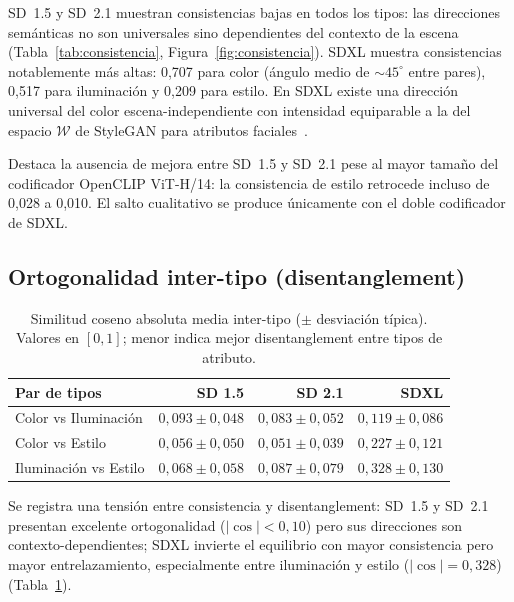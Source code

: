 \documentclass[12pt, a4paper, twoside]{book}
\begin{document}
SD~1.5 y SD~2.1 muestran consistencias bajas en todos los tipos: las direcciones semánticas
no son universales sino dependientes del contexto de la escena
(Tabla~\ref{tab:consistencia}, Figura~\ref{fig:consistencia}).
SDXL muestra consistencias notablemente más altas: 0,707 para color (ángulo medio de ${\sim}45^{\circ}$
entre pares), 0,517 para iluminación y 0,209 para estilo. En SDXL existe una dirección
universal del color escena-independiente con intensidad equiparable a la del espacio $\mathcal{W}$
de StyleGAN para atributos faciales~\citep{shen2020interfacegan}.

Destaca la ausencia de mejora entre SD~1.5 y SD~2.1 pese al mayor tamaño del codificador
OpenCLIP ViT-H/14: la consistencia de estilo retrocede incluso de 0,028 a 0,010. El salto
cualitativo se produce únicamente con el doble codificador de SDXL.

\subsection{Ortogonalidad inter-tipo (disentanglement)}
\label{subsec:res:ortogonalidad}

\begin{table}[htb]
\centering
\caption{Similitud coseno absoluta media inter-tipo ($\pm$ desviación típica).
Valores en $[0, 1]$; menor indica mejor disentanglement entre tipos de atributo.}
\label{tab:ortogonalidad}
\small
\begin{tabular}{lrrr}
\toprule
\textbf{Par de tipos} & \textbf{SD 1.5} & \textbf{SD 2.1} & \textbf{SDXL} \\
\midrule
Color vs Iluminación  & $0{,}093 \pm 0{,}048$ & $0{,}083 \pm 0{,}052$ & $0{,}119 \pm 0{,}086$ \\
Color vs Estilo       & $0{,}056 \pm 0{,}050$ & $0{,}051 \pm 0{,}039$ & $0{,}227 \pm 0{,}121$ \\
Iluminación vs Estilo & $0{,}068 \pm 0{,}058$ & $0{,}087 \pm 0{,}079$ & $0{,}328 \pm 0{,}130$ \\
\bottomrule
\end{tabular}
\end{table}

Se registra una tensión entre consistencia y disentanglement: SD~1.5 y SD~2.1
presentan excelente ortogonalidad ($|\cos| < 0{,}10$) pero sus direcciones son
contexto-dependientes; SDXL invierte el equilibrio con mayor consistencia pero mayor
entrelazamiento, especialmente entre iluminación y estilo ($|\cos| = 0{,}328$)
(Tabla~\ref{tab:ortogonalidad}).
\end{document}
